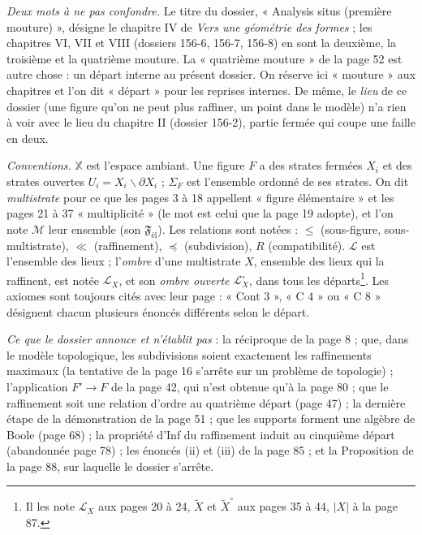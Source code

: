 \documentclass[11pt,a4paper]{article}
\begin{document}
\emph{Deux mots à ne pas confondre.} Le titre du dossier, « Analysis situs
(première mouture) », désigne le chapitre IV de \emph{Vers une géométrie des
formes} ; les chapitres VI, VII et VIII (dossiers 156-6, 156-7, 156-8) en sont
la deuxième, la troisième et la quatrième mouture. La « quatrième mouture » de
la page 52 est autre chose : un départ interne au présent dossier. On réserve
ici « mouture » aux chapitres et l'on dit « départ » pour les reprises
internes. De même, le \emph{lieu} de ce dossier (une figure qu'on ne peut
plus raffiner, un point dans le modèle) n'a rien à voir avec le lieu du
chapitre II (dossier 156-2), partie fermée qui coupe une faille en deux.

\emph{Conventions.} $\mathbb{X}$ est l'espace ambiant. Une figure $F$ a des
strates fermées $X_{i}$ et des strates ouvertes $U_{i} = X_{i} \smallsetminus
\partial X_{i}$ ; $\Sigma_{F}$ est l'ensemble ordonné de ses strates. On dit
\emph{multistrate} pour ce que les pages 3 à 18 appellent « figure
élémentaire » et les pages 21 à 37 « multiplicité » (le mot est celui que la
page 19 adopte), et l'on note $\mathcal{M}$ leur ensemble (son
$\mathfrak{F}_{\text{él}}$). Les relations sont notées : $\leq$ (sous-figure,
sous-multistrate), $\ll$ (raffinement), $\preccurlyeq$ (subdivision), $R$
(compatibilité). $\mathcal{L}$ est l'ensemble des lieux ; l'\emph{ombre} d'une
multistrate $X$, ensemble des lieux qui la raffinent, est notée
$\mathcal{L}_{X}$, et son \emph{ombre ouverte} $\mathcal{L}^{\circ}_{X}$, dans
tous les départs\footnote{Il les note $\mathcal{L}_{X}$ aux pages 20 à 24,
$\widetilde{X}$ et $\widetilde{X}^{\circ}$ aux pages 35 à 44, $|X|$ à la page
87.}. Les axiomes sont toujours cités avec leur page : « Cont 3 », « C 4 » ou
« C 8 » désignent chacun plusieurs énoncés différents selon le départ.

\emph{Ce que le dossier annonce et n'établit pas} : la réciproque de la page
8 ; que, dans le modèle topologique, les subdivisions soient exactement les
raffinements maximaux (la tentative de la page 16 s'arrête sur un problème de
topologie) ; l'application $F' \to F$ de la page 42, qui n'est obtenue qu'à la
page 80 ; que le raffinement soit une relation d'ordre au quatrième départ
(page 47) ; la dernière étape de la démonstration de la page 51 ; que les
supports forment une algèbre de Boole (page 68) ; la propriété d'Inf du
raffinement induit au cinquième départ (abandonnée page 78) ; les énoncés
(ii) et (iii) de la page 85 ; et la Proposition de la page 88, sur laquelle le
dossier s'arrête.
\end{document}
